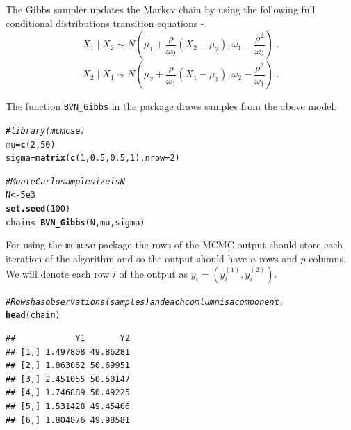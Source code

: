\documentclass[11pt]{article}\usepackage[]{graphicx}\usepackage[]{color}
\makeatletter
\newcommand{\hlnum}[1]{\textcolor[rgb]{0.686,0.059,0.569}{#1}}%
\newcommand{\hlcom}[1]{\textcolor[rgb]{0.678,0.584,0.686}{\textit{#1}}}%
\newcommand{\hlstd}[1]{\textcolor[rgb]{0.345,0.345,0.345}{#1}}%
\newcommand{\hlkwb}[1]{\textcolor[rgb]{0.69,0.353,0.396}{#1}}%
\newcommand{\hlkwc}[1]{\textcolor[rgb]{0.333,0.667,0.333}{#1}}%
\newcommand{\hlkwd}[1]{\textcolor[rgb]{0.737,0.353,0.396}{\textbf{#1}}}%
\newenvironment{kframe}{%
 \def\at@end@of@kframe{}%
 \ifinner\ifhmode%
  \def\at@end@of@kframe{\end{minipage}}%
  \begin{minipage}{\columnwidth}%
 \fi\fi%
 \def\FrameCommand##1{\hskip\@totalleftmargin \hskip-\fboxsep
 \colorbox{shadecolor}{##1}\hskip-\fboxsep
     \hskip-\linewidth \hskip-\@totalleftmargin \hskip\columnwidth}%
 \MakeFramed {\advance\hsize-\width
   \@totalleftmargin\z@ \linewidth\hsize
   \@setminipage}}%
 {\par\unskip\endMakeFramed%
 \at@end@of@kframe}
\newenvironment{knitrout}{}{} %
\makeatother
\begin{document}
The Gibbs sampler updates the Markov chain by using the following full conditional distributions transition equations -
\[
X_{1} \mid X_{2} \sim  N\left(\mu_{1} + \dfrac{\rho}{\omega_2}\left(X_{2} - \mu_{2}\right) , \omega_1 - \dfrac{\rho^{2}}{\omega_2}\right) \; .
\]
\[
X_{2} \mid X_{1} \sim  N\left(\mu_{2} + \dfrac{\rho}{\omega_1}\left(X_{1} - \mu_{1}\right) , \omega_2 - \dfrac{\rho^{2}}{\omega_1}\right) \; .
\]

The function \texttt{BVN\_Gibbs} in the package draws samples from the above model. 

\begin{knitrout}
\color{fgcolor}\begin{kframe}
\begin{alltt}
\hlcom{#library(mcmcse)}
\hlstd{mu} \hlkwb{=} \hlkwd{c}\hlstd{(}\hlnum{2}\hlstd{,} \hlnum{50}\hlstd{)}
\hlstd{sigma} \hlkwb{=} \hlkwd{matrix}\hlstd{(}\hlkwd{c}\hlstd{(}\hlnum{1}\hlstd{,} \hlnum{0.5}\hlstd{,} \hlnum{0.5}\hlstd{,} \hlnum{1}\hlstd{),} \hlkwc{nrow} \hlstd{=} \hlnum{2}\hlstd{)}

\hlcom{# Monte Carlo sample size is N}
\hlstd{N} \hlkwb{<-} \hlnum{5e3}
\hlkwd{set.seed}\hlstd{(}\hlnum{100}\hlstd{)}
\hlstd{chain} \hlkwb{<-} \hlkwd{BVN_Gibbs}\hlstd{(N, mu, sigma)}
\end{alltt}
\end{kframe}
\end{knitrout}

For using the \texttt{mcmcse} package the rows of the MCMC output should store each iteration of the algorithm and so the output should have $n$ rows and $p$ columns. We will denote each row $i$ of the output as $y_i = (y^{(1)}_i, y^{(2)}_i)$.

\begin{knitrout}
\color{fgcolor}\begin{kframe}
\begin{alltt}
\hlcom{#Rows has observations (samples) and each comlumn is a component. }
\hlkwd{head}\hlstd{(chain)}
\end{alltt}
\begin{verbatim}
##            Y1       Y2
## [1,] 1.497808 49.86281
## [2,] 1.863062 50.69951
## [3,] 2.451055 50.50147
## [4,] 1.746889 50.49225
## [5,] 1.531428 49.45406
## [6,] 1.804876 49.98581
\end{verbatim}
\end{kframe}
\end{knitrout}
\end{document}
